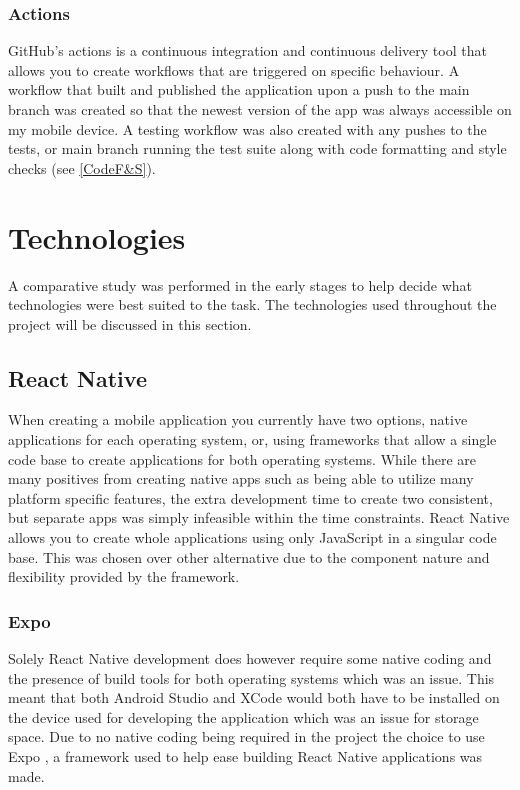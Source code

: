\subsubsection{Actions}
GitHub's actions is a continuous integration and continuous delivery tool that allows you to create workflows that are triggered on specific behaviour. A workflow that built and published the application upon a push to the main branch was created so that the newest version of the app was always accessible on my mobile device. A testing workflow was also created with any pushes to the tests, or main branch running the test suite along with code formatting and style checks (see \ref{CodeF&S}).
\section{Technologies}
A comparative study \cite{compStudy} was performed in the early stages to help decide what technologies were best suited to the task. The technologies used throughout the project will be discussed in this section.
\subsection{React Native}
When creating a mobile application you currently have two options, native applications for each operating system, or, using frameworks that allow a single code base to create applications for both operating systems. While there are many positives from creating native apps such as being able to utilize many platform specific features, the extra development time to create two consistent, but separate apps was simply infeasible within the time constraints. React Native \cite{reactnative} allows you to create whole applications using only JavaScript \cite{js} in a singular code base. This was chosen over other alternative due to the component nature and flexibility provided by the framework. 
\subsubsection{Expo}
Solely React Native development does however require some native coding and the presence of build tools for both operating systems which was an issue. This meant that both Android Studio and XCode would both have to be installed on the device used for developing the application which was an issue for storage space. Due to no native coding being required in the project the choice to use Expo \cite{expo}, a framework used to help ease building React Native applications was made.
